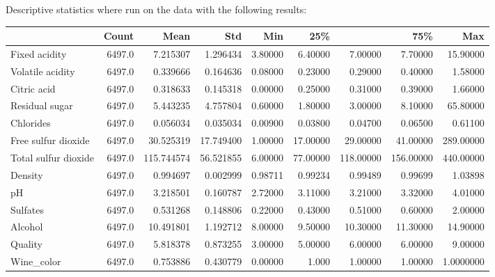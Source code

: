 \documentclass[]{article}
\begin{document}
Descriptive statistics where run on the data with the following results:
\begin{table}[ht]
	\centering
	\begin{tabular}{|l | r| r | r | r | r | r | r | r |}
		\hline
                    &   Count  &      Mean &       Std &     Min  &     25\% &          & 75\%       & Max        \\
\hline
Fixed acidity       &  6497.0  &  7.215307 &  1.296434 & 3.80000  & 6.40000  & 7.00000  &   7.70000  & 15.90000   \\
Volatile acidity    &  6497.0  &  0.339666 &  0.164636 & 0.08000  & 0.23000  & 0.29000  &   0.40000  &  1.58000   \\
Citric acid         &  6497.0  &  0.318633 &  0.145318 & 0.00000  & 0.25000  & 0.31000  &   0.39000  &  1.66000   \\
Residual sugar      &  6497.0  &  5.443235 &  4.757804 & 0.60000  & 1.80000  & 3.00000  &   8.10000  & 65.80000   \\
Chlorides           &  6497.0  &  0.056034 &  0.035034 & 0.00900  & 0.03800  & 0.04700  &   0.06500  &  0.61100   \\
Free sulfur dioxide &  6497.0  & 30.525319 & 17.749400 & 1.00000  &17.00000  & 29.00000 &   41.00000 & 289.00000  \\
Total sulfur dioxide&  6497.0  &115.744574 & 56.521855 & 6.00000  &77.00000  & 118.00000&   156.00000&  440.00000 \\ 
Density             &  6497.0  &  0.994697 &  0.002999 & 0.98711  & 0.99234  & 0.99489  &   0.99699  &  1.03898   \\
pH                  &  6497.0  &  3.218501 &  0.160787 & 2.72000  & 3.11000  & 3.21000  &   3.32000  &  4.01000   \\
Sulfates           &  6497.0  &  0.531268 &  0.148806 & 0.22000  & 0.43000  & 0.51000  &   0.60000  &  2.00000   \\
Alcohol             &  6497.0  & 10.491801 &  1.192712 & 8.00000  & 9.50000  & 10.30000 &   11.30000 &  14.90000  \\
Quality             &  6497.0  &  5.818378 &  0.873255 & 3.00000  & 5.00000  & 6.00000  &   6.00000  &  9.00000   \\
Wine{\_}color       &  6497.0  &  0.753886 &  0.430779 & 0.00000  & 1.000    & 1.00000  &   1.00000  &  1.0000000 \\  
		\hline	
\end{tabular}		
\end{table}
\end{document}
